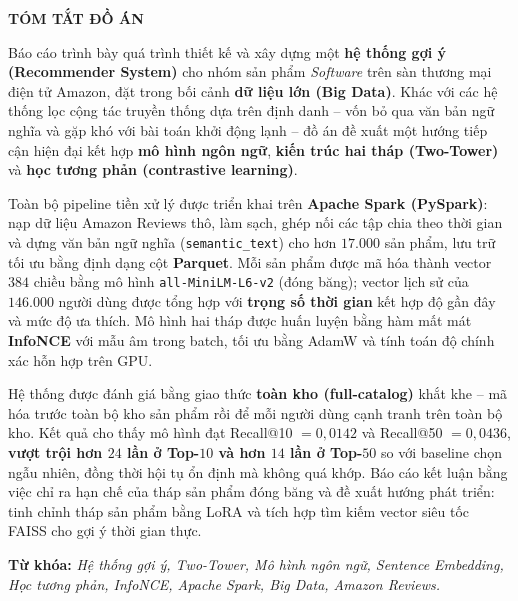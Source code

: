 \newpage
\thispagestyle{plain}
\vspace*{0.5cm}
\begin{center}
    {\LARGE\textbf{\MakeUppercase{Tóm tắt đồ án}}}
\end{center}
\vspace{0.4cm}

Báo cáo trình bày quá trình thiết kế và xây dựng một \textbf{hệ thống gợi ý
(Recommender System)} cho nhóm sản phẩm \textit{Software} trên sàn thương mại điện
tử Amazon, đặt trong bối cảnh \textbf{dữ liệu lớn (Big Data)}. Khác với các hệ thống
lọc cộng tác truyền thống dựa trên định danh -- vốn bỏ qua văn bản ngữ nghĩa và gặp
khó với bài toán khởi động lạnh -- đồ án đề xuất một hướng tiếp cận hiện đại kết hợp
\textbf{mô hình ngôn ngữ}, \textbf{kiến trúc hai tháp (Two-Tower)} và \textbf{học
tương phản (contrastive learning)}.

\vspace{0.25cm}
Toàn bộ pipeline tiền xử lý được triển khai trên \textbf{Apache Spark (PySpark)}:
nạp dữ liệu Amazon Reviews thô, làm sạch, ghép nối các tập chia theo thời gian và
dựng văn bản ngữ nghĩa (\texttt{semantic\_text}) cho hơn $17.000$ sản phẩm, lưu trữ
tối ưu bằng định dạng cột \textbf{Parquet}. Mỗi sản phẩm được mã hóa thành vector
$384$ chiều bằng mô hình \texttt{all-MiniLM-L6-v2} (đóng băng); vector lịch sử của
$146.000$ người dùng được tổng hợp với \textbf{trọng số thời gian} kết hợp độ gần
đây và mức độ ưa thích. Mô hình hai tháp được huấn luyện bằng hàm mất mát
\textbf{InfoNCE} với mẫu âm trong batch, tối ưu bằng AdamW và tính toán độ chính xác
hỗn hợp trên GPU.

\vspace{0.25cm}
Hệ thống được đánh giá bằng giao thức \textbf{toàn kho (full-catalog)} khắt khe --
mã hóa trước toàn bộ kho sản phẩm rồi để mỗi người dùng cạnh tranh trên toàn bộ kho.
Kết quả cho thấy mô hình đạt Recall@10 $= 0{,}0142$ và Recall@50 $= 0{,}0436$,
\textbf{vượt trội hơn $24$ lần ở Top-$10$ và hơn $14$ lần ở Top-$50$} so với baseline
chọn ngẫu nhiên, đồng thời hội tụ ổn định mà không quá khớp. Báo cáo kết luận bằng
việc chỉ ra hạn chế của tháp sản phẩm đóng băng và đề xuất hướng phát triển: tinh
chỉnh tháp sản phẩm bằng LoRA và tích hợp tìm kiếm vector siêu tốc FAISS cho gợi ý
thời gian thực.

\vspace{0.4cm}
\noindent\textbf{Từ khóa:} \textit{Hệ thống gợi ý, Two-Tower, Mô hình ngôn ngữ,
Sentence Embedding, Học tương phản, InfoNCE, Apache Spark, Big Data, Amazon Reviews.}

